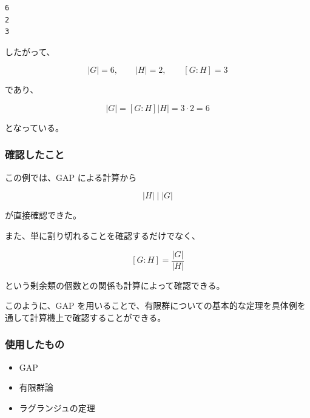 \begin{lstlisting}
6
2
3
\end{lstlisting}

したがって、

\[
|G|=6,\qquad |H|=2,\qquad [G:H]=3
\]

であり、

\[
|G|=[G:H]|H|=3\cdot2=6
\]

となっている。

\subsubsection{確認したこと}

この例では、GAP による計算から

\[
|H|\mid |G|
\]

が直接確認できた。

また、単に割り切れることを確認するだけでなく、

\[
[G:H]=\frac{|G|}{|H|}
\]

という剰余類の個数との関係も計算によって確認できる。

このように、GAP を用いることで、有限群についての基本的な定理を具体例を通して計算機上で確認することができる。

\subsubsection{使用したもの}

\begin{itemize}
  \item GAP
  \item 有限群論
  \item ラグランジュの定理
\end{itemize}